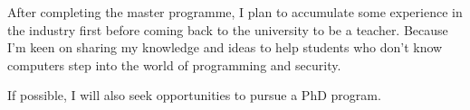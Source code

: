 
After completing the master programme, I plan to accumulate some experience in the industry first before coming back to the university to be a teacher.
Because I'm keen on sharing my knowledge and ideas to help students who don't know computers step into the world of programming and security.

If possible, I will also seek opportunities to pursue a PhD program.